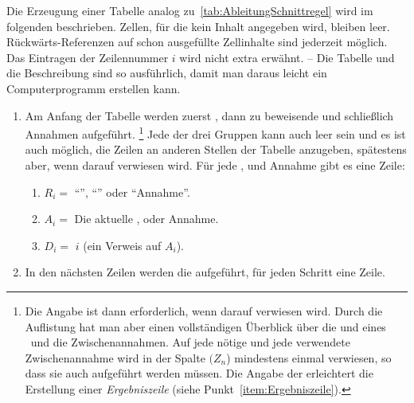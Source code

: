 {Die Erzeugung einer Tabelle analog zu~\vref{tab:AbleitungSchnittregel} wird im folgenden beschrieben.
Zellen, für die kein Inhalt angegeben wird, bleiben leer.
Rückwärts-Referenzen auf schon ausgefüllte Zellinhalte sind jederzeit möglich.
Das Eintragen der Zeilennummer $i$ wird nicht extra erwähnt.
-- Die Tabelle und die Beschreibung sind so ausführlich, damit man daraus leicht ein Computerprogramm erstellen kann.
%
\begin{enumerate}
	\item Am Anfang der Tabelle werden zuerst , dann zu beweisende  und schließlich Annahmen aufgeführt.%
	\footnote{%
		Die Angabe ist dann erforderlich, wenn darauf verwiesen wird.
		Durch die Auflistung hat man aber einen vollständigen Überblick über die  und  eines \Beweises\ und die Zwischenannahmen.
		Auf jede nötige  und jede verwendete Zwischenannahme wird in der Spalte $(Z_n$) mindestens einmal verwiesen, so dass sie auch aufgeführt werden müssen.
		Die Angabe der  erleichtert die Erstellung einer \emph{Ergebniszeile} (siehe Punkt~\ref{item:Ergebniszeile}).
	}
	Jede der drei Gruppen kann auch leer sein und es ist auch möglich, die Zeilen an anderen Stellen der Tabelle anzugeben, spätestens aber, wenn darauf verwiesen wird.
	Für jede ,  und Annahme gibt es eine Zeile:
	\begin{enumerate}
		\item $R_i =$ \enquote{}, \enquote{} oder \enquote{Annahme}.
		\item $A_i =$ Die aktuelle ,  oder Annahme.
		\item $D_i =$ $i$ \quad (ein Verweis auf $A_i$).
	\end{enumerate}
	\item In den nächsten Zeilen werden die  aufgeführt, für jeden Schritt eine Zeile.


\end{enumerate}}
